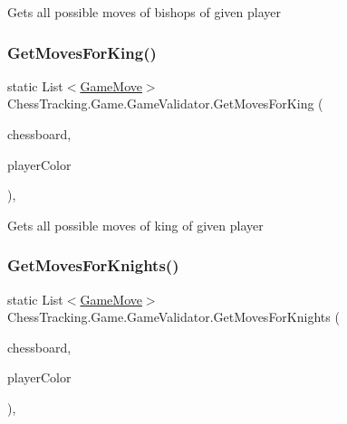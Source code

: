 Gets all possible moves of bishops of given player 

\mbox{\label{class_chess_tracking_1_1_game_1_1_game_validator_a18ce16abbc46f5d7823f26866b34cdc8}} 
\subsubsection{\texorpdfstring{GetMovesForKing()}{GetMovesForKing()}}
{\footnotesize\ttfamily static List$<$\mbox{\hyperlink{class_chess_tracking_1_1_game_1_1_game_move}{Game\+Move}}$>$ Chess\+Tracking.\+Game.\+Game\+Validator.\+Get\+Moves\+For\+King (\begin{DoxyParamCaption}\item[{\mbox{\hyperlink{class_chess_tracking_1_1_game_1_1_chessboard_model}{Chessboard\+Model}}}]{chessboard,  }\item[{\mbox{\hyperlink{namespace_chess_tracking_1_1_game_ab79070a55977a8c8326e9cdda7dcfa9a}{Player\+Color}}}]{player\+Color }\end{DoxyParamCaption})\hspace{0.3cm}{\ttfamily [static]}, {\ttfamily [private]}}



Gets all possible moves of king of given player 

\mbox{\label{class_chess_tracking_1_1_game_1_1_game_validator_a991d89bd66ce11ad6dfd4299466b9150}} 
\subsubsection{\texorpdfstring{GetMovesForKnights()}{GetMovesForKnights()}}
{\footnotesize\ttfamily static List$<$\mbox{\hyperlink{class_chess_tracking_1_1_game_1_1_game_move}{Game\+Move}}$>$ Chess\+Tracking.\+Game.\+Game\+Validator.\+Get\+Moves\+For\+Knights (\begin{DoxyParamCaption}\item[{\mbox{\hyperlink{class_chess_tracking_1_1_game_1_1_chessboard_model}{Chessboard\+Model}}}]{chessboard,  }\item[{\mbox{\hyperlink{namespace_chess_tracking_1_1_game_ab79070a55977a8c8326e9cdda7dcfa9a}{Player\+Color}}}]{player\+Color }\end{DoxyParamCaption})\hspace{0.3cm}{\ttfamily [static]}, {\ttfamily [private]}}




